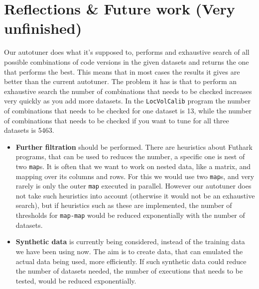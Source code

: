 \section{Reflections \& Future work (Very unfinished)}

Our autotuner does what it's supposed to, performs and exhaustive search of all
possible combinations of code versions in the given datasets and returns the
one that performs the best. This means that in most cases the results it gives
are better than the current autotuner. The problem it has is that to perform an
exhaustive search the number of combinations that needs to be checked increases
very quickly as you add more datasets. In the \texttt{LocVolCalib} program the
number of combinations that needs to be checked for one dataset is 13, while
the number of combinations that needs to be checked if you want to tune for all
three datasets is 5463. 

\begin{itemize}
	\item \textbf{Further filtration} should be performed. There are heuristics
    about Futhark programs, that can be used to reduces the number, a specific
    one is nest of two \texttt{map}s. It is often that we want to work on
    nested data, like a matrix, and mapping over its columns and rows. For this
    we would use two \texttt{map}s, and very rarely is only the outer
    \texttt{map} executed in parallel. However our autotuner does not take such
    heuristics into account (otherwise it would not be an exhaustive search),
    but if heuristics such as these are implemented, the number of thresholds
    for \texttt{map-map} would be reduced exponentially with the number of
    datasets.
	\item \textbf{Synthetic data} is currently being considered, instead of the
    training data we have been using now. The aim is to create data, that can
    emulated the actual data being used, more efficiently. If such synthetic
    data could reduce the number of datasets needed, the number of executions
    that needs to be tested, would be reduced exponentially.	
\end{itemize}

